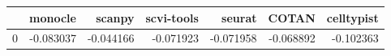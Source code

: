 \begin{tabular}{lrrrrrr}
\toprule
 & monocle & scanpy & scvi-tools & seurat & COTAN & celltypist \\
\midrule
0 & -0.083037 & -0.044166 & -0.071923 & -0.071958 & -0.068892 & -0.102363 \\
\bottomrule
\end{tabular}
